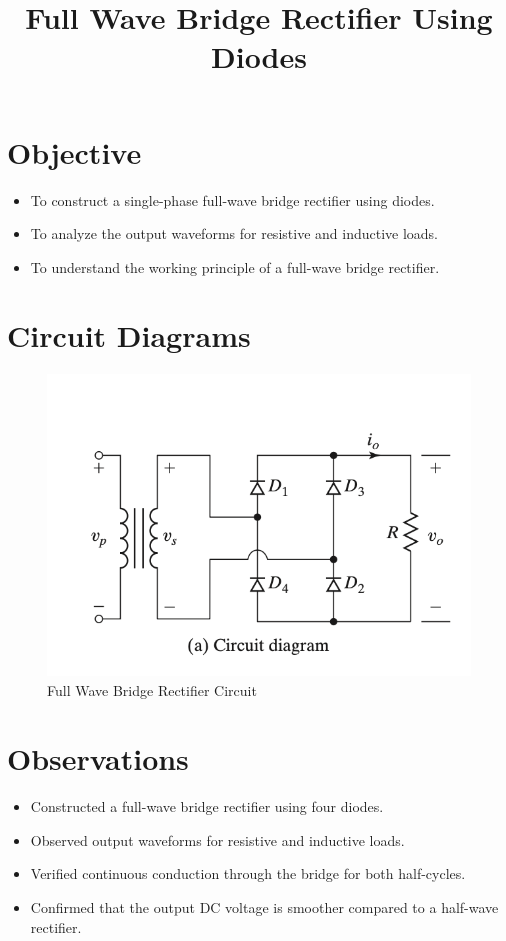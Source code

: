 \documentclass[12pt]{article}
\title{Full Wave Bridge Rectifier Using Diodes}
\author{}
\date{}
\begin{document}
\pagebreak
{}
\maketitle

\section*{Objective}
\begin{itemize}
    \item To construct a single-phase full-wave bridge rectifier using diodes.
    \item To analyze the output waveforms for resistive and inductive loads.
    \item To understand the working principle of a full-wave bridge rectifier.
\end{itemize}

\section*{Circuit Diagrams}
\begin{figure}[H]
    \centering
    \includegraphics[width=.5\textwidth]{bridge_ckt.png}
    \caption{Full Wave Bridge Rectifier Circuit \cite{rashid2013power}}
    \label{fig:dc_r_load}
\end{figure}

\section*{Observations}
\begin{itemize}
    \item Constructed a full-wave bridge rectifier using four diodes.
    \item Observed output waveforms for resistive and inductive loads.
    \item Verified continuous conduction through the bridge for both half-cycles.
    \item Confirmed that the output DC voltage is smoother compared to a half-wave rectifier.
\end{itemize}
\end{document}
